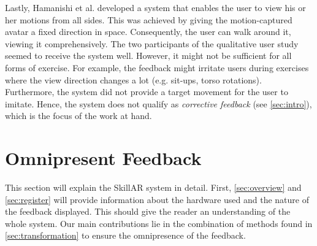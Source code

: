 Lastly, Hamanishi et al. \cite{Hamanishi2019avu} developed a system that enables the user to view his or her motions from all sides. This was achieved by giving the motion-captured avatar a fixed direction in space. Consequently, the user can walk around it, viewing it comprehensively. The two participants of the qualitative user study seemed to receive the system well. However, it might not be sufficient for all forms of exercise. For example, the feedback might irritate users during exercises where the view direction changes a lot (e.g. sit-ups, torso rotations). Furthermore, the system did not provide a target movement for the user to imitate. Hence, the system does not qualify as \emph{corrective feedback} (see \autoref{sec:intro}), which is the focus of the work at hand.

\section{Omnipresent Feedback}
This section will explain the SkillAR system in detail. First, \autoref{sec:overview} and \autoref{sec:register} will provide information about the hardware used and the nature of the feedback displayed. This should give the reader an understanding of the whole system. Our main contributions lie in the combination of methods found in \autoref{sec:transformation} to ensure the omnipresence of the feedback.

